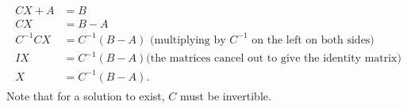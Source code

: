 \documentclass[letterpaper,10pt,english]{jupyterBook}
\begin{document}
\begin{equation*}
\begin{split} \begin{align*}
    C X + A &= B \\
    CX &= B - A \\
    C^{-1} C X &= C^{-1} (B - A) \textrm{ (multiplying by }C^{-1} \textrm{ on the left on both sides)}\\
    I X &= C^{-1}(B - A) \textrm{(the matrices cancel out to give the identity matrix)}\\
    X &= C^{-1}(B - A).
\end{align*} \end{split}
\end{equation*}
\sphinxAtStartPar
Note that for a solution to exist, \(C\) must be invertible.
\label{_pages/1.6_Matrix_algebra:matrix-algebra-example}
\end{document}
